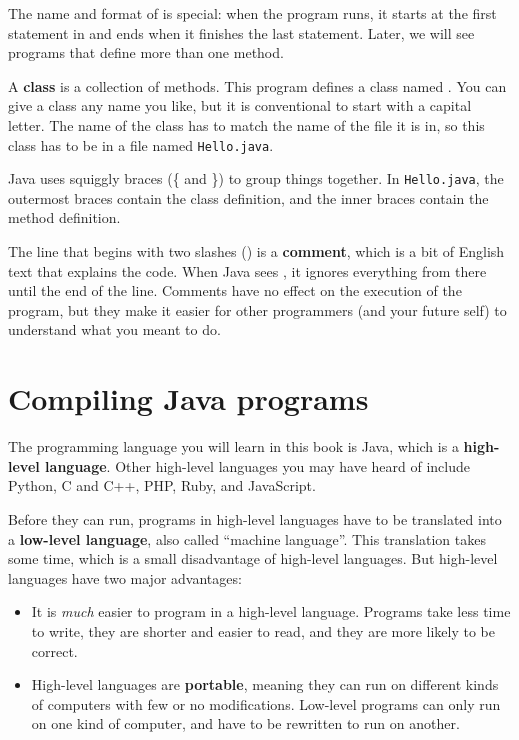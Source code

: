 
The name and format of  is special: when the program runs, it starts at the first statement in  and ends when it finishes the last statement.
Later, we will see programs that define more than one method.


A {\bf class} is a collection of methods.
This program defines a class named .
You can give a class any name you like, but it is conventional to start with a capital letter.
The name of the class has to match the name of the file it is in, so this class has to be in a file named {\tt Hello.java}.

Java uses squiggly braces (\{ and \}) to group things together.
In {\tt Hello.java}, the outermost braces contain the class definition, and the inner braces contain the method definition.


The line that begins with two slashes (\java{//}) is a {\bf comment}, which is a bit of English text that explains the code.
When Java sees \java{//}, it ignores everything from there until the end of the line.
Comments have no effect on the execution of the program, but they make it easier for other programmers (and your future self) to understand what you meant to do.


\section{Compiling Java programs}


The programming language you will learn in this book is Java, which is a {\bf high-level language}.
Other high-level languages you may have heard of include Python, C and C++, PHP, Ruby, and JavaScript.


Before they can run, programs in high-level languages have to be translated into a {\bf low-level language}, also called ``machine language''.
This translation takes some time, which is a small disadvantage of high-level languages.
But high-level languages have two major advantages:

\begin{itemize}

\item It is {\em much} easier to program in a high-level language.
Programs take less time to write, they are shorter and easier to read, and they are more likely to be correct.


\item High-level languages are {\bf portable}, meaning they can run on different kinds of computers with few or no modifications.
Low-level programs can only run on one kind of computer, and have to be rewritten to run on another.

\end{itemize}

